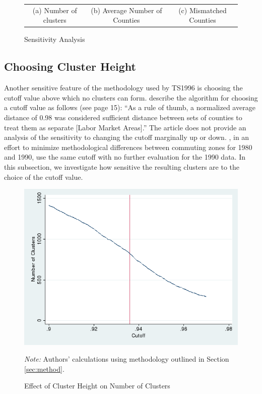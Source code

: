 \begin{figure}
\caption{Sensitivity Analysis \label{fig:sensitivity}}
\begin{tabular}{ccc}
(a) Number of clusters & (b) Average Number of Counties & (c) Mismatched Counties \\
\end{tabular}
\end{figure}

\subsection{Choosing Cluster Height}

Another sensitive feature of the methodology used by TS1996 is choosing the cutoff value above which no clusters can form. \cite{TK1987} describe the algorithm for choosing a cutoff value as follows (see page 15): ``As a rule of thumb, a normalized average distance of 0.98 was considered sufficient distance between sets of counties to treat them as separate [Labor Market Areas].'' The article does not provide an analysis of the sensitivity to changing the cutoff marginally up or down. \cite{TS1996}, in an effort to minimize methodological differences between commuting zones for 1980 and 1990, use the same cutoff with no further evaluation for the 1990 data. In this subsection, we investigate how sensitive the resulting clusters are to the choice of the cutoff value.

\begin{figure}
\includegraphics[scale=0.5]{./figures/numclus_cutoff.png}
\caption{Effect of Cluster Height on Number of Clusters \label{fig:cutoff_count}}
\emph{Note:} Authors' calculations using methodology outlined in Section \ref{sec:method}.
\end{figure}

